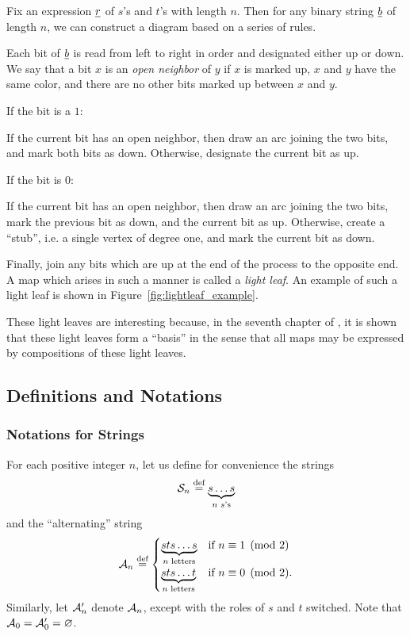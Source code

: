Fix an expression $\ul r$ of $s$'s and $t$'s with length $n$.  Then for any binary string $\ul b$ of length $n$, we can construct a diagram based on a series of rules.

Each bit of $\ul b$ is read from left to right in order and designated either up or down.  We say that a bit $x$ is an \emph{open neighbor} of $y$ if $x$ is marked up, $x$ and $y$ have the same color, and there are no other bits marked up between $x$ and $y$.
\begin{itemize}
	\ii If the bit is a $1$:
	\begin{itemize}
		\ii If the current bit has an open neighbor, then draw an arc joining the two bits, and mark both bits as down.
		\ii Otherwise, designate the current bit as up.
	\end{itemize}
	\ii If the bit is $0$:
	\begin{itemize}
		\ii If the current bit has an open neighbor, then draw an arc joining the two bits, mark the previous bit as down, and the current bit as up.
		\ii Otherwise, create a ``stub'', i.e. a single vertex of degree one, and mark the current bit as down.
	\end{itemize}
\end{itemize}
Finally, join any bits which are up at the end of the process to the opposite end.  A map which arises in such a manner is called a \emph{light leaf}.  An example of such a light leaf is shown in Figure~\ref{fig:lightleaf_example}.

These light leaves are interesting because, in the seventh chapter of \cite{span}, it is shown that these light leaves form a ``basis'' in the sense that all maps may be expressed by compositions of these light leaves.

\subsection{Definitions and Notations}
\label{sec:prelim_def_notation}
\subsubsection{Notations for Strings}
For each positive integer $n$, let us define for convenience the strings
\[ \SS_n \defeq \underbrace{s \dots s}_{\text{$n$ $s$'s}} \] 
and the ``alternating'' string
\[
	\AA_n \defeq
	\begin{cases}
		\underbrace{sts\dots s}_{\text{$n$ letters}} & \text{if } n \equiv 1 \pmod{2} \\
		\underbrace{sts\dots t}_{\text{$n$ letters}} & \text{if } n \equiv 0 \pmod{2}. 
	\end{cases}
\]
Similarly, let $\AA_n'$ denote $\AA_n$, except with the roles of $s$ and $t$ switched.  Note that $\AA_0 = \AA_0' = \varnothing$.

